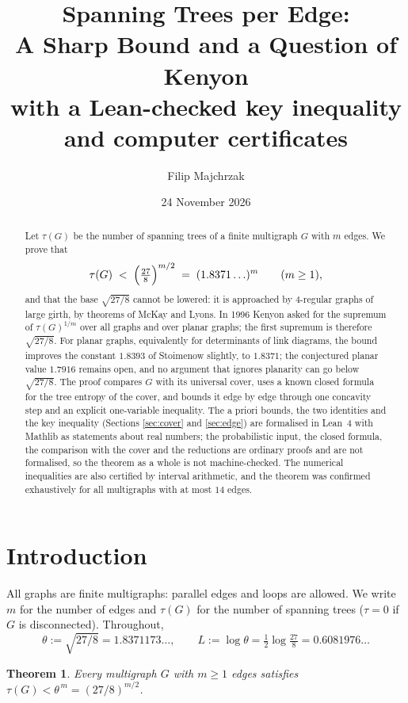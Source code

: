 \documentclass[11pt]{amsart}
\title[Spanning trees per edge]{Spanning Trees per Edge:\\ A Sharp Bound and a Question of Kenyon\\[4pt] {\normalfont\large with a Lean-checked key inequality and computer certificates}}
\author{Filip Majchrzak}
\date{24 November 2026}
\theoremstyle{plain}
\newtheorem{theorem}{Theorem}
\theoremstyle{remark}
\newcommand{\tht}{\theta}
\begin{document}
\begin{abstract}
Let $\tau(G)$ be the number of spanning trees of a finite multigraph $G$ with $m$ edges. We prove that
\[
  \tau(G)\;<\;\Bigl(\tfrac{27}{8}\Bigr)^{m/2}\;=\;(1.8371\ldots)^m\qquad(m\ge1),
\]
and that the base $\sqrt{27/8}$ cannot be lowered: it is approached by $4$-regular graphs of large girth, by
theorems of McKay and Lyons. In 1996 Kenyon asked for the supremum of $\tau(G)^{1/m}$ over all graphs and over planar graphs;
the first supremum is therefore $\sqrt{27/8}$. For planar graphs, equivalently for determinants of link diagrams,
the bound improves the constant $1.8393$ of Stoimenow slightly, to $1.8371$; the conjectured planar value
$1.7916$ remains open, and no argument that ignores planarity can go below $\sqrt{27/8}$. The proof compares
$G$ with its universal cover, uses a known closed formula for the tree entropy of the cover, and bounds it edge
by edge through one concavity step and an explicit one-variable inequality.
The a priori bounds, the two identities and the key inequality (Sections \ref{sec:cover} and \ref{sec:edge}) are formalised in Lean~4 with Mathlib as statements about real numbers; the probabilistic input, the closed formula, the comparison with the cover and the reductions are ordinary proofs and are not formalised, so the theorem as a whole is not machine-checked. The numerical inequalities are also certified by interval arithmetic, and the theorem was confirmed exhaustively for all multigraphs with at most $14$ edges.
\end{abstract}

\maketitle

\section{Introduction}

All graphs are finite multigraphs: parallel edges and loops are allowed. We write $m$ for the number of edges and
$\tau(G)$ for the number of spanning trees ($\tau=0$ if $G$ is disconnected). Throughout,
\[
  \tht:=\sqrt{27/8}=1.8371173\ldots,\qquad L:=\log\tht=\tfrac12\log\tfrac{27}{8}=0.6081976\ldots
\]

\begin{theorem}\label{thm:main}
Every multigraph $G$ with $m\ge1$ edges satisfies $\tau(G)<\tht^{\,m}=(27/8)^{m/2}$.
\end{theorem}
\end{document}
